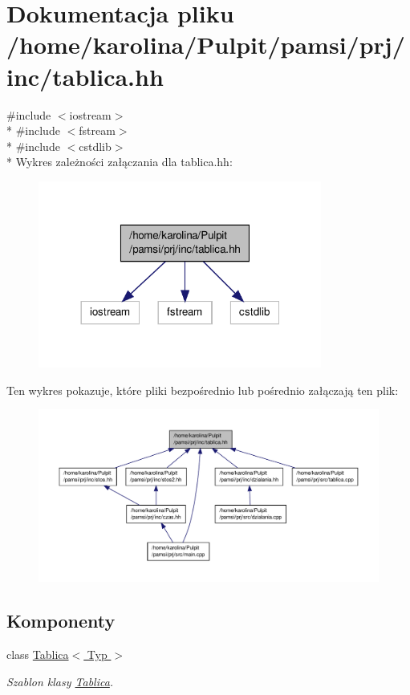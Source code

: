 \hypertarget{tablica_8hh}{\section{Dokumentacja pliku /home/karolina/\-Pulpit/pamsi/prj/inc/tablica.hh}
\label{tablica_8hh}
}
{\ttfamily \#include $<$iostream$>$}\\*
{\ttfamily \#include $<$fstream$>$}\\*
{\ttfamily \#include $<$cstdlib$>$}\\*
Wykres zależności załączania dla tablica.\-hh\-:\nopagebreak
\begin{figure}[H]
\begin{center}
\leavevmode
\includegraphics[width=264pt]{tablica_8hh__incl}
\end{center}
\end{figure}
Ten wykres pokazuje, które pliki bezpośrednio lub pośrednio załączają ten plik\-:\nopagebreak
\begin{figure}[H]
\begin{center}
\leavevmode
\includegraphics[width=350pt]{tablica_8hh__dep__incl}
\end{center}
\end{figure}
\subsection*{Komponenty}
\begin{DoxyCompactItemize}
\item 
class \hyperlink{class_tablica}{Tablica$<$ Typ $>$}
\begin{DoxyCompactList}\small\item\em Szablon klasy \hyperlink{class_tablica}{Tablica}. \end{DoxyCompactList}\end{DoxyCompactItemize}
